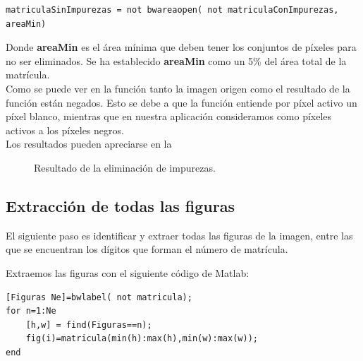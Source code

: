 \begin{lstlisting}
matriculaSinImpurezas = not bwareaopen( not matriculaConImpurezas, areaMin)
\end{lstlisting}


Donde \textbf{areaMin} es el área mínima que deben tener los conjuntos de píxeles para no ser eliminados. Se ha establecido \textbf{areaMin} como un 5\% del área total de la matrícula.\\

Como se puede ver en la función tanto la imagen origen como el resultado de la función están negados. Esto se debe a que la función entiende por píxel activo un píxel blanco, mientras que en nuestra aplicación consideramos como píxeles activos a los píxeles negros.\\

Los resultados pueden apreciarse en la 

\begin{figure}[!h]
\centering {}
\caption{\small{Resultado de la eliminación de impurezas.}} \label{Impurezas}
\end{figure}

\subsection{Extracción de todas las figuras}
El siguiente paso es identificar y extraer todas las figuras de la imagen, entre las que se encuentran los dígitos que forman el número de matrícula.

\newpage 
Extraemos las figuras con el siguiente código de Matlab:

\begin{lstlisting}
[Figuras Ne]=bwlabel( not matricula);
for n=1:Ne
	[h,w] = find(Figuras==n);
	fig(i)=matricula(min(h):max(h),min(w):max(w));
end
\end{lstlisting}

